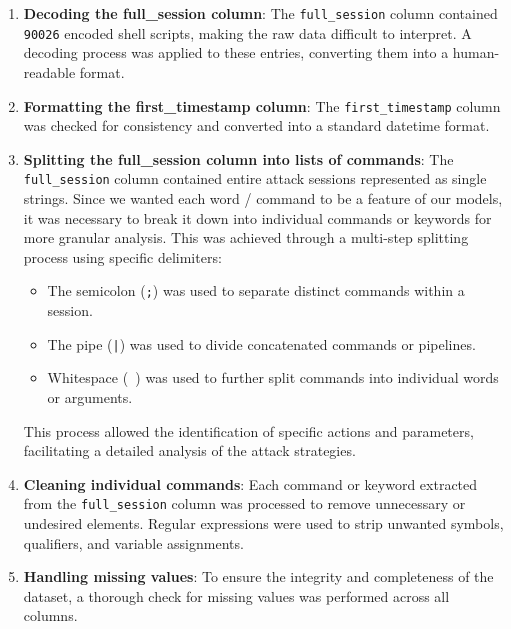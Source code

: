         \begin{enumerate}
        
            \item \textbf{Decoding the \textbf{full\_session} column}: The \texttt{full\_session} column contained \texttt{90026} encoded shell scripts, making the raw data difficult to interpret. A decoding process was applied to these entries, converting them into a human-readable format.
            
            \item \textbf{Formatting the \textbf{first\_timestamp} column}: The \texttt{first\_timestamp} column was checked for consistency and converted into a standard datetime format.
            
            \item \textbf{Splitting the \textbf{full\_session} column into lists of commands}: 
            The \texttt{full\_session} column contained entire attack sessions represented as single strings. Since we wanted each word / command to be a feature of our models, it was necessary to break it down into individual commands or keywords for more granular analysis. This was achieved through a multi-step splitting process using specific delimiters:
            
            \begin{itemize}
                \item The semicolon (\texttt{;}) was used to separate distinct commands within a session.
                \item The pipe (\texttt{|}) was used to divide concatenated commands or pipelines.
                \item Whitespace (\texttt{ }) was used to further split commands into individual words or arguments.
            \end{itemize}
            
            This process allowed the identification of specific actions and parameters, facilitating a detailed analysis of the attack strategies.
            
            \item \textbf{Cleaning individual commands}: Each command or keyword extracted from the \texttt{full\_session} column was processed to remove unnecessary or undesired elements. Regular expressions were used to strip unwanted symbols, qualifiers, and variable assignments. 
            
            \item \textbf{Handling missing values}: 
            To ensure the integrity and completeness of the dataset, a thorough check for missing values was performed across all columns.
            
        \end{enumerate}
        
